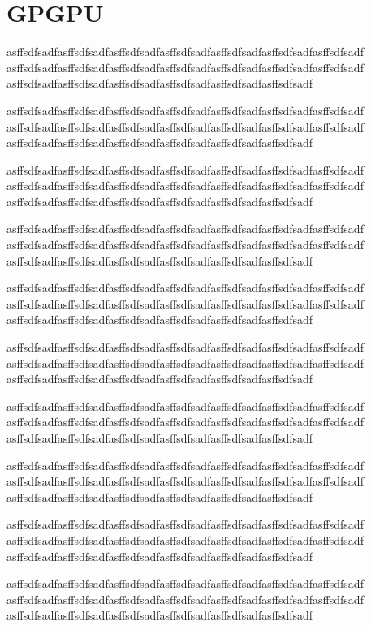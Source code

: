 \documentclass[MTech]{iitmdiss}
\begin{document}
\section{GPGPU}
asffsdfsadfasffsdfsadfasffsdfsadfasffsdfsadfasffsdfsadfasffsdfsadfasffsdfsadf
asffsdfsadfasffsdfsadfasffsdfsadfasffsdfsadfasffsdfsadfasffsdfsadfasffsdfsadf
asffsdfsadfasffsdfsadfasffsdfsadfasffsdfsadfasffsdfsadfasffsdfsadf


asffsdfsadfasffsdfsadfasffsdfsadfasffsdfsadfasffsdfsadfasffsdfsadfasffsdfsadf
asffsdfsadfasffsdfsadfasffsdfsadfasffsdfsadfasffsdfsadfasffsdfsadfasffsdfsadf
asffsdfsadfasffsdfsadfasffsdfsadfasffsdfsadfasffsdfsadfasffsdfsadf

asffsdfsadfasffsdfsadfasffsdfsadfasffsdfsadfasffsdfsadfasffsdfsadfasffsdfsadf
asffsdfsadfasffsdfsadfasffsdfsadfasffsdfsadfasffsdfsadfasffsdfsadfasffsdfsadf
asffsdfsadfasffsdfsadfasffsdfsadfasffsdfsadfasffsdfsadfasffsdfsadf


asffsdfsadfasffsdfsadfasffsdfsadfasffsdfsadfasffsdfsadfasffsdfsadfasffsdfsadf
asffsdfsadfasffsdfsadfasffsdfsadfasffsdfsadfasffsdfsadfasffsdfsadfasffsdfsadf
asffsdfsadfasffsdfsadfasffsdfsadfasffsdfsadfasffsdfsadfasffsdfsadf

asffsdfsadfasffsdfsadfasffsdfsadfasffsdfsadfasffsdfsadfasffsdfsadfasffsdfsadf
asffsdfsadfasffsdfsadfasffsdfsadfasffsdfsadfasffsdfsadfasffsdfsadfasffsdfsadf
asffsdfsadfasffsdfsadfasffsdfsadfasffsdfsadfasffsdfsadfasffsdfsadf


asffsdfsadfasffsdfsadfasffsdfsadfasffsdfsadfasffsdfsadfasffsdfsadfasffsdfsadf
asffsdfsadfasffsdfsadfasffsdfsadfasffsdfsadfasffsdfsadfasffsdfsadfasffsdfsadf
asffsdfsadfasffsdfsadfasffsdfsadfasffsdfsadfasffsdfsadfasffsdfsadf

asffsdfsadfasffsdfsadfasffsdfsadfasffsdfsadfasffsdfsadfasffsdfsadfasffsdfsadf
asffsdfsadfasffsdfsadfasffsdfsadfasffsdfsadfasffsdfsadfasffsdfsadfasffsdfsadf
asffsdfsadfasffsdfsadfasffsdfsadfasffsdfsadfasffsdfsadfasffsdfsadf


asffsdfsadfasffsdfsadfasffsdfsadfasffsdfsadfasffsdfsadfasffsdfsadfasffsdfsadf
asffsdfsadfasffsdfsadfasffsdfsadfasffsdfsadfasffsdfsadfasffsdfsadfasffsdfsadf
asffsdfsadfasffsdfsadfasffsdfsadfasffsdfsadfasffsdfsadfasffsdfsadf

asffsdfsadfasffsdfsadfasffsdfsadfasffsdfsadfasffsdfsadfasffsdfsadfasffsdfsadf
asffsdfsadfasffsdfsadfasffsdfsadfasffsdfsadfasffsdfsadfasffsdfsadfasffsdfsadf
asffsdfsadfasffsdfsadfasffsdfsadfasffsdfsadfasffsdfsadfasffsdfsadf


asffsdfsadfasffsdfsadfasffsdfsadfasffsdfsadfasffsdfsadfasffsdfsadfasffsdfsadf
asffsdfsadfasffsdfsadfasffsdfsadfasffsdfsadfasffsdfsadfasffsdfsadfasffsdfsadf
asffsdfsadfasffsdfsadfasffsdfsadfasffsdfsadfasffsdfsadfasffsdfsadf
\end{document}
